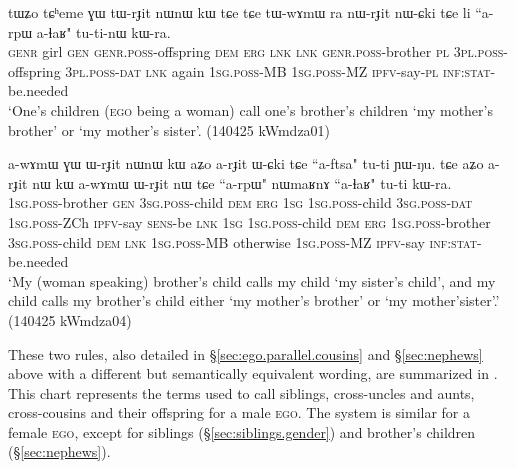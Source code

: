  \begin{exe}
\ex \label{ex:MBCh.2}
\gll tɯʑo tɕʰeme ɣɯ tɯ-rɟit nɯnɯ kɯ tɕe tɕe tɯ-wɤmɯ ra nɯ-rɟit nɯ-ɕki tɕe li ``a-rpɯ a-ɬaʁ"  tu-ti-nɯ kɯ-ra. \\
\textsc{genr} girl \textsc{gen} \textsc{genr}.\textsc{poss}-offspring \textsc{dem} \textsc{erg} \textsc{lnk} \textsc{lnk} \textsc{genr}.\textsc{poss}-brother \textsc{pl}  \textsc{3pl}.\textsc{poss}-offspring  \textsc{3pl}.\textsc{poss}-\textsc{dat} \textsc{lnk} again \textsc{1sg}.\textsc{poss}-MB \textsc{1sg}.\textsc{poss}-MZ \textsc{ipfv}-say-\textsc{pl} \textsc{inf}:\textsc{stat}-be.needed \\
\glt `One's children (\textsc{ego} being a woman) call one's brother's children  `my mother's brother' or  `my mother's sister'. (140425 kWmdza01)
\end{exe}

\begin{exe}
\ex \label{ex:FZCh.2}
\gll a-wɤmɯ ɣɯ ɯ-rɟit nɯnɯ kɯ aʑo a-rɟit ɯ-ɕki tɕe ``a-ftsa" tu-ti ɲɯ-ŋu.  tɕe aʑo a-rɟit nɯ kɯ a-wɤmɯ ɯ-rɟit nɯ tɕe ``a-rpɯ" nɯmaʁnɤ ``a-ɬaʁ" tu-ti kɯ-ra. \\
\textsc{1sg}.\textsc{poss}-brother \textsc{gen} \textsc{3sg}.\textsc{poss}-child \textsc{dem} \textsc{erg} \textsc{1sg} \textsc{1sg}.\textsc{poss}-child \textsc{3sg}.\textsc{poss}-\textsc{dat} \textsc{1sg}.\textsc{poss}-ZCh \textsc{ipfv}-say \textsc{sens}-be  \textsc{lnk} \textsc{1sg} \textsc{1sg}.\textsc{poss}-child \textsc{dem} \textsc{erg} \textsc{1sg}.\textsc{poss}-brother \textsc{3sg}.\textsc{poss}-child \textsc{dem} \textsc{lnk} \textsc{1sg}.\textsc{poss}-MB otherwise \textsc{1sg}.\textsc{poss}-MZ \textsc{ipfv}-say \textsc{inf}:\textsc{stat}-be.needed  \\
\glt `My (woman speaking) brother's child calls my child  `my sister's child', and my child  calls my brother's child either  `my mother's brother' or  `my mother'sister'.'  (140425 kWmdza04)
\end{exe}

These two rules, also detailed in §\ref{sec:ego.parallel.cousins} and §\ref{sec:nephews} above with a different but semantically equivalent wording, are summarized in . This chart represents the terms used to call siblings, cross-uncles and aunts, cross-cousins and their offspring for a male \textsc{ego}. The system is similar for a female \textsc{ego}, except for  siblings (§\ref{sec:siblings.gender}) and brother's children (§\ref{sec:nephews}).

